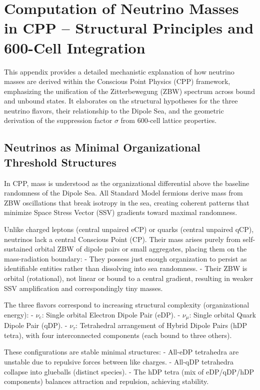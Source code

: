 \documentclass{article}
\begin{document}
\appendix
\section{Computation of Neutrino Masses in CPP -- Structural Principles and 600-Cell Integration}

This appendix provides a detailed mechanistic explanation of how neutrino masses are derived within the Conscious Point Physics (CPP) framework, emphasizing the unification of the Zitterbewegung (ZBW) spectrum across bound and unbound states. It elaborates on the structural hypotheses for the three neutrino flavors, their relationship to the Dipole Sea, and the geometric derivation of the suppression factor $\sigma$ from 600-cell lattice properties.

\subsection{Neutrinos as Minimal Organizational Threshold Structures}

In CPP, mass is understood as the organizational differential above the baseline randomness of the Dipole Sea. All Standard Model fermions derive mass from ZBW oscillations that break isotropy in the sea, creating coherent patterns that minimize Space Stress Vector (SSV) gradients toward maximal randomness.

Unlike charged leptons (central unpaired eCP) or quarks (central unpaired qCP), neutrinos lack a central Conscious Point (CP). Their mass arises purely from self-sustained orbital ZBW of dipole pairs or small aggregates, placing them on the mass-radiation boundary:
- They possess just enough organization to persist as identifiable entities rather than dissolving into sea randomness.
- Their ZBW is orbital (rotational), not linear or bound to a central gradient, resulting in weaker SSV amplification and correspondingly tiny masses.

The three flavors correspond to increasing structural complexity (organizational energy):
- $\nu_e$: Single orbital Electron Dipole Pair (eDP).
- $\nu_\mu$: Single orbital Quark Dipole Pair (qDP).
- $\nu_\tau$: Tetrahedral arrangement of Hybrid Dipole Pairs (hDP tetra), with four interconnected components (each bound to three others).

These configurations are stable minimal structures:
- All-eDP tetrahedra are unstable due to repulsive forces between like charges.
- All-qDP tetrahedra collapse into glueballs (distinct species).
- The hDP tetra (mix of eDP/qDP/hDP components) balances attraction and repulsion, achieving stability.
\end{document}
